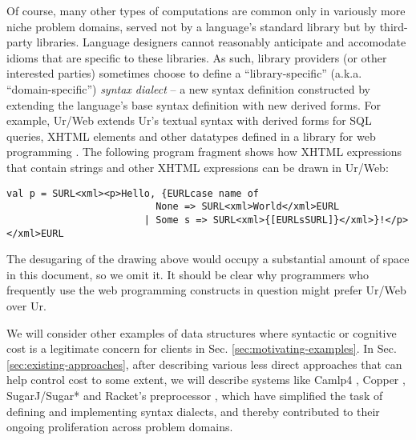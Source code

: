 Of course, many other types of computations are common only in variously more niche problem domains, served not by a language's standard library but by  third-party libraries. Language designers cannot reasonably anticipate and accomodate idioms that are specific to these libraries. As such, library providers (or other interested parties) sometimes choose to define a ``library-specific'' (a.k.a. ``domain-specific'') \emph{syntax dialect} -- a new syntax definition constructed by extending the language's base syntax definition with new derived forms. For example, Ur/Web extends Ur's textual syntax with derived forms for SQL queries, XHTML elements and other datatypes defined in a library for web programming \cite{conf/popl/Chlipala15}. The  following program fragment shows how XHTML expressions that contain strings and other XHTML expressions can be drawn in Ur/Web: %
\begin{lstlisting}[numbers=none]
val p = SURL<xml><p>Hello, {EURLcase name of
                          None => SURL<xml>World</xml>EURL
                        | Some s => SURL<xml>{[EURLsSURL]}</xml>}!</p></xml>EURL
\end{lstlisting}                              
The desugaring of the drawing above would occupy a substantial amount of space in this document, so we omit it. It should be clear why programmers who frequently use the web programming constructs in question might prefer Ur/Web over Ur.

We will consider other examples of data structures where syntactic or cognitive cost is a legitimate concern for clients in Sec. \ref{sec:motivating-examples}. In Sec. \ref{sec:existing-approaches}, after describing various less direct approaches that can help control  cost to some extent, we will describe systems like Camlp4 \cite{ocaml-manual}, Copper \cite{conf/gpce/WykS07}, SugarJ/Sugar* \cite{erdweg2011sugarj,erdweg2013framework} and Racket's preprocessor \cite{Flatt:2012:CLR:2063176.2063195}, which have simplified the task of defining and implementing syntax dialects, and thereby contributed to their ongoing proliferation across problem domains.



